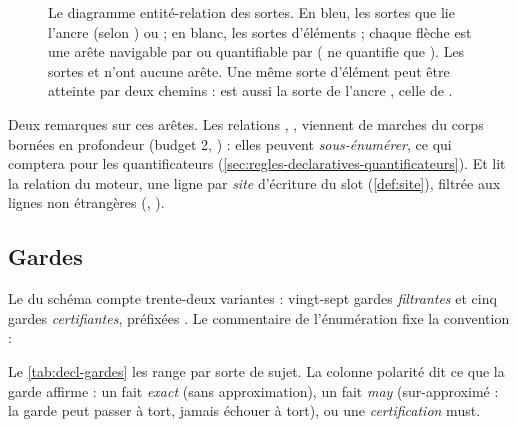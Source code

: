 \begin{figure}[htbp]
\caption{Le diagramme entité-relation des sortes. En bleu, les sortes que lie l'ancre  (selon ) ou  ; en blanc, les sortes d'éléments ; chaque flèche est une arête navigable par  ou quantifiable par  ( ne quantifie que ). Les sortes  et  n'ont aucune arête. Une même sorte d'élément peut être atteinte par deux chemins :  est aussi la sorte de l'ancre ,  celle de .}
\label{fig:decl-sortes}
\end{figure}

Deux remarques sur ces arêtes. Les relations , ,  viennent de marches du corps bornées en profondeur (budget 2, ) : elles peuvent \emph{sous-énumérer}, ce qui comptera pour les quantificateurs (\cref{sec:regles-declaratives-quantificateurs}). Et  lit la relation  du moteur, une ligne par \emph{site} d'écriture du slot (\cref{def:site}), filtrée aux lignes non étrangères (, ).

\subsection{Gardes}

Le  du schéma compte trente-deux variantes : vingt-sept gardes \emph{filtrantes} et cinq gardes \emph{certifiantes}, préfixées . Le commentaire de l'énumération fixe la convention :


Le \cref{tab:decl-gardes} les range par sorte de sujet. La colonne \og polarité\fg{} dit ce que la garde affirme : un fait \emph{exact} (sans approximation), un fait \emph{may} (sur-approximé : la garde peut passer à tort, jamais échouer à tort), ou une \emph{certification} must.

